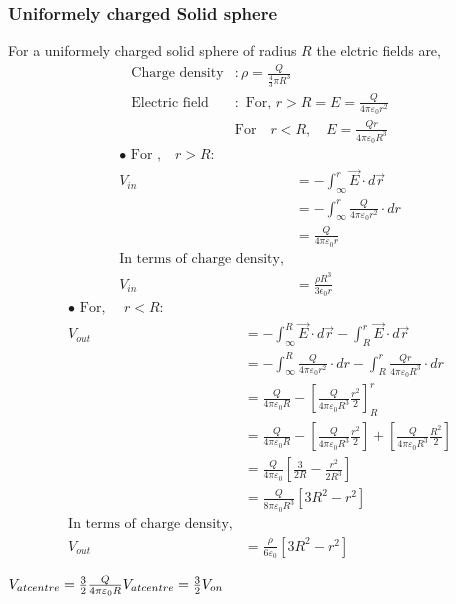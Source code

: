 \subsubsection{Uniformely charged Solid sphere}
For a uniformely charged solid sphere of radius $R$ the elctric fields are,
\begin{align*}
	\text{Charge density}&:\rho=\frac{Q}{\frac{4}{3} \pi R^{3}}\\
	\text{Electric field}&:\text { For, } r>R=E=\frac{Q}{4 \pi \varepsilon_{0} r^{2}}
	\\&\text {For}\quad r<R, \quad E=\frac{Qr}{4 \pi \varepsilon_{0} R^{3}}
	\end{align*}
 \begin{align*}
	\bullet\text { For ,}\quad r>R:\\
	V_{in}&=-\int_{\infty}^{r} \vec{E}\cdot d \vec{r}\\
	&=-\int_{\infty}^{r} \frac{Q}{4 \pi \varepsilon_{0} r^{2}}\cdot d {r}\\
	&=\frac{Q}{4 \pi \varepsilon_{0} r}\\
	\text{In terms of charge density,}\\
	V_{in}&=\frac{\rho R^{3}}{3\epsilon_{0} r}
\end{align*}
 \begin{align*}
	\bullet	\text { For, } \quad r<R:\\
	V_{out}&=-\int_{\infty}^{R} \vec{E}\cdot d \vec{r}-\int_{R}^{r} \vec{E}\cdot d \vec{r}\\
	&=-\int_{\infty}^{R} \frac{Q}{4 \pi \varepsilon_{0} r^{2}}\cdot d {r}-\int_{R}^{r} \frac{Qr}{4 \pi \varepsilon_{0} R^{3}} \cdot d {r}\\
	&=\frac{Q}{4 \pi \varepsilon_{0} R}-\left[\frac{Q }{4 \pi \varepsilon_{0} R^{3}} \frac{r^{2}}{2} \right]_{R}^{r}\\
		&=\frac{Q}{4 \pi \varepsilon_{0} R}-\left[\frac{Q }{4 \pi \varepsilon_{0} R^{3}} \frac{r^{2}}{2} \right]+\left[\frac{Q }{4 \pi \varepsilon_{0} R^{3}} \frac{R^{2}}{2} \right]\\ 
		&=\frac{Q }{4 \pi \varepsilon_{0}}\left[\frac{3}{2R}-\frac{r^{2}}{2R^{3}} \right]\\ 
		&=\frac{Q }{8 \pi \varepsilon_{0}R^{3}}\left[3R^{2}-r^{2} \right]\\
	\text{In terms of charge density,}\\
	V_{out}&=\frac{\rho }{6  \varepsilon_{0}}\left[3R^{2}-r^{2} \right]
\end{align*}
\begin{note}
$	V_{at centre}=\frac{3}{2}\frac{Q}{4 \pi \varepsilon_{0} R}\\
	V_{at centre}=\frac{3}{2}V_{on}$
\end{note}
